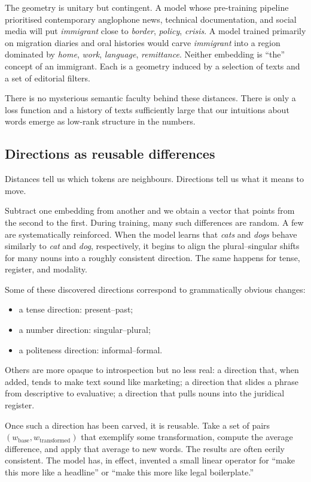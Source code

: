 The geometry is unitary but contingent. A model whose pre-training pipeline prioritised contemporary anglophone news, technical documentation, and social media will put \emph{immigrant} close to \emph{border}, \emph{policy}, \emph{crisis}. A model trained primarily on migration diaries and oral histories would carve \emph{immigrant} into a region dominated by \emph{home}, \emph{work}, \emph{language}, \emph{remittance}. Neither embedding is ``the'' concept of an immigrant. Each is a geometry induced by a selection of texts and a set of editorial filters.

There is no mysterious semantic faculty behind these distances. There is only a loss function and a history of texts sufficiently large that our intuitions about words emerge as low-rank structure in the numbers.

\subsection*{Directions as reusable differences}

Distances tell us which tokens are neighbours. Directions tell us what it means to move.

Subtract one embedding from another and we obtain a vector that points from the second to the first. During training, many such differences are random. A few are systematically reinforced. When the model learns that \emph{cats} and \emph{dogs} behave similarly to \emph{cat} and \emph{dog}, respectively, it begins to align the plural--singular shifts for many nouns into a roughly consistent direction. The same happens for tense, register, and modality.

Some of these discovered directions correspond to grammatically obvious changes:

\begin{itemize}
  \item a tense direction: present--past;
  \item a number direction: singular--plural;
  \item a politeness direction: informal--formal.
\end{itemize}

Others are more opaque to introspection but no less real: a direction that, when added, tends to make text sound like marketing; a direction that slides a phrase from descriptive to evaluative; a direction that pulls nouns into the juridical register.

Once such a direction has been carved, it is reusable. Take a set of pairs $(w_{\mathrm{base}}, w_{\mathrm{transformed}})$ that exemplify some transformation, compute the average difference, and apply that average to new words. The results are often eerily consistent. The model has, in effect, invented a small linear operator for ``make this more like a headline'' or ``make this more like legal boilerplate.''

